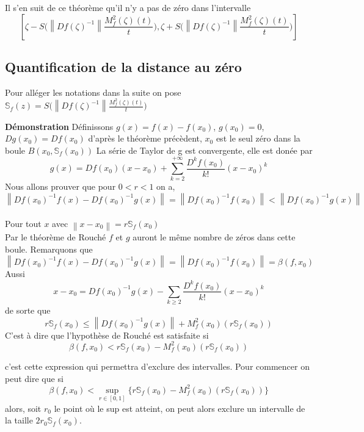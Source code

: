 \documentclass[a4paper,10.5pt]{article}
\begin{document}
	\noindent Il s'en suit de ce théorème qu'il n'y a pas de zéro dans l'intervalle \[[\zeta-S\Big(\left\|Df(\zeta)^{-1}\right\|\frac{M_{f}^{2}(\zeta)(t)}{t}\Big),\zeta+S\Big(\left\|Df(\zeta)^{-1}\right\|\frac{M_{f}^{2}(\zeta)(t)}{t}\Big)]\]
	
	\subsection{Quantification de la distance au zéro}
	Pour alléger les notations dans la suite on pose $\mathbb{S}_{f}(z)=S\Big(\left\|Df(\zeta)^{-1}\right\|\frac{M_{f}^{2}(\zeta)(t)}{t}\Big)$
	
	
	
	\noindent\textbf{Démonstration} Définissons $g(x)=f(x)-f(x_0)$, $g(x_0)=0$, $Dg(x_0)=Df(x_0)$ d'après le théorème précèdent, $x_0$ est le seul zéro dans la boule
	$B(x_0,\mathbb{S}_{f}(x_0))$
	La série de Taylor de g est convergente, elle est donée par
	\[g(x)=Df(x_0)(x-x_0)+ \sum_{k=2}^{+\infty}\frac{D^{k}f(x_0)}{k!}(x-x_0)^k\]
	Nous allons prouver que pour $0<r<1$ on a,
	\[\left\|Df(x_0)^{-1}f(x)-Df(x_0)^{-1}g(x)\right\|=\left\|Df(x_0)^{-1}f(x_0)\right\|<\left\|Df(x_0)^{-1}g(x)\right\|\]
	\\
	Pour tout $x$ avec $\left\|x-x_0\right\|=r\mathbb{S}_{f}(x_0)$
	\\
	Par le théorème de Rouché $f$ et $g$ auront le même nombre de zéros dans cette boule. Remarquons que 
	\[\left\|Df(x_0)^{-1}f(x)-Df(x_0)^{-1}g(x)\right\|=\left\|Df(x_0)^{-1}f(x_0)\right\|=\beta(f,x_0)\]
	Aussi
	\[x-x_0=Df(x_0)^{-1}g(x)-\sum_{k \geq 2}\frac{D^{k}f(x_0)}{k!}(x-x_0)^k\]
	de sorte que
	\[r\mathbb{S}_{f}(x_0) \leq \left\|Df(x_0)^{-1}g(x)\right\|+M_{f}^{2}(x_0)(r\mathbb{S}_{f}(x_0)) \]
	C'est à dire que l'hypothèse de Rouché est satisfaite si
	\[\beta(f,x_0)<r\mathbb{S}_{f}(x_0)-M_{f}^{2}(x_0)(r\mathbb{S}_{f}(x_0))\] 
	
	c'est cette expression qui permettra d'exclure des intervalles. Pour commencer on peut dire que si 
	\[\beta(f,x_0)< \sup_{r \in [0,1]}\{r\mathbb{S}_{f}(x_0)-M_{f}^{2}(x_0)(r\mathbb{S}_{f}(x_0))\}\]
	alors, soit $r_0$ le point où le sup est atteint, on peut alors exclure un intervalle de la taille $2r_0\mathbb{S}_{f}(x_0)$.
	
	
	
	

	
\end{document}
